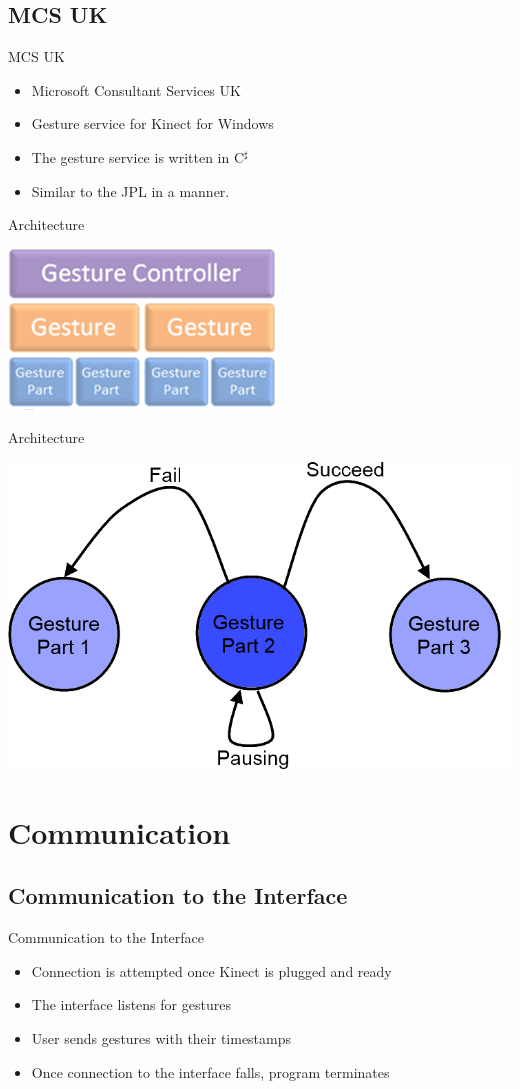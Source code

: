 \documentclass{beamer}
\begin{document}
\subsection{MCS UK}
\begin{frame}{MCS UK}
 \begin{itemize}
 \item Microsoft Consultant Services UK
 \item Gesture service for Kinect for Windows
 \item The gesture service is written in C$^\sharp$
 \item Similar to the JPL in a manner.
 \end{itemize}
\end{frame}
\begin{frame}{Architecture}
\centerline{\includegraphics{mcsarc.png}}
\end{frame}
\begin{frame}{Architecture}
\centerline{\includegraphics[scale = 0.5]{gesturestate.png}}
\end{frame}
\section{Communication}
\subsection{Communication to the Interface}
\begin{frame}{Communication to the Interface}
\begin{itemize}
 \item Connection is attempted once Kinect is plugged and ready
 \item The interface listens for gestures
 \item User sends gestures with their timestamps
 \item Once connection to the interface falls, program terminates
\end{itemize}
\end{frame}
\end{document}
